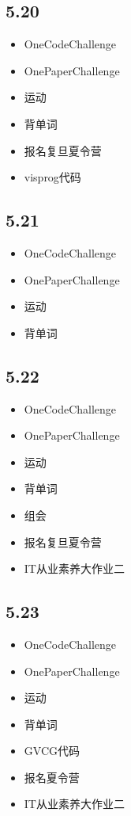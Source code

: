 \documentclass[UTF8]{ctexart}
\begin{document}
\subsection*{5.20}
\begin{itemize}
    \item OneCodeChallenge
    \item OnePaperChallenge
    \item 运动
    \item 背单词
    \item 报名复旦夏令营
    \item visprog代码
\end{itemize}

\subsection*{5.21}
\begin{itemize}
    \item OneCodeChallenge
    \item OnePaperChallenge
    \item 运动
    \item 背单词
\end{itemize}

\subsection*{5.22}
\begin{itemize}
    \item OneCodeChallenge
    \item OnePaperChallenge
    \item 运动
    \item 背单词
    \item 组会
    \item 报名复旦夏令营
    \item IT从业素养大作业二
\end{itemize}

\subsection*{5.23}
\begin{itemize}
    \item OneCodeChallenge
    \item OnePaperChallenge
    \item 运动
    \item 背单词
    \item GVCG代码
    \item 报名夏令营
    \item IT从业素养大作业二
\end{itemize}
\end{document}
